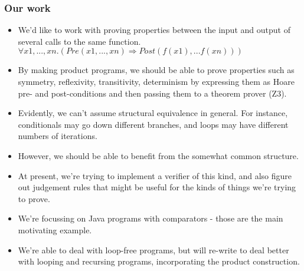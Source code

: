 \documentclass{beamer}
\begin{document}
\begin{frame}[allowframebreaks]
\frametitle{Our work}
\begin{itemize}
\item We'd like to work with proving properties between the input and
  output of several calls to the same function.\\
$ \forall x1, ..., xn. ( Pre(x1, ... , xn) \Rightarrow Post(f(x1),
  ... f(xn))) $
\item By making product programs, we should be able to prove
  properties such as symmetry, reflexivity, transitivity, determinism
  by expressing them as Hoare pre- and post-conditions and then
  passing them to a theorem prover (Z3).
\item Evidently, we can't assume structural equivalence in
  general. For instance, conditionals may go down different branches,
  and loops may have different numbers of iterations.
\item However, we should be able to benefit from the somewhat common
  structure.
\item At present, we're trying to implement a verifier of this kind,
  and also figure out judgement rules that
  might be useful for the kinds of things we're trying to prove.
\item We're focussing on Java programs with comparators - those are
  the main motivating example.
\item We're able to deal with loop-free programs, but will re-write to
  deal better with looping and recursing programs, incorporating the
  product construction.
\end{itemize}
\end{frame}
\end{document}
